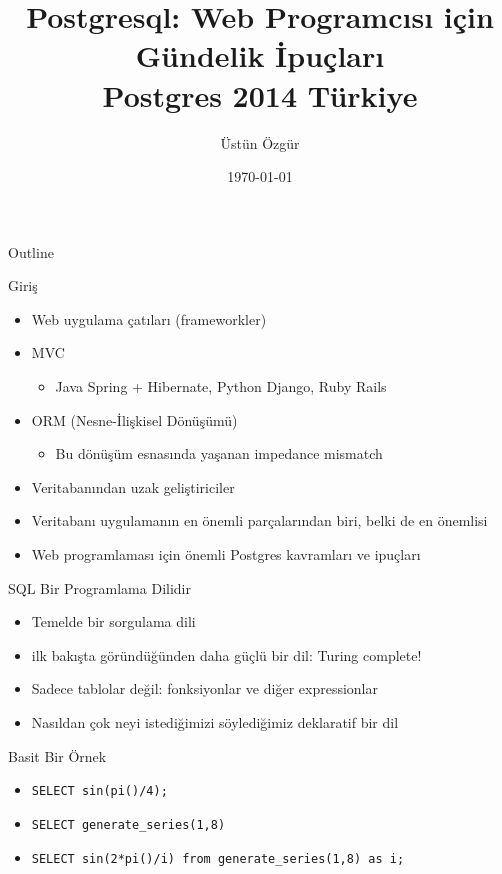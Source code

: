 \documentclass[presentation]{beamer}
\author{Üstün Özgür}
\date{\today}
\title{Postgresql: Web Programcısı için Gündelik İpuçları \\ Postgres 2014 Türkiye}
\begin{document}
\maketitle
\begin{frame}{Outline}
\tableofcontents
\end{frame}


\begin{frame}[label=sec-1]{Giriş}
\begin{itemize}
\item Web uygulama çatıları (frameworkler)

\item MVC
\begin{itemize}
\item Java Spring + Hibernate, Python Django, Ruby Rails
\end{itemize}
\item ORM (Nesne-İlişkisel Dönüşümü)
\begin{itemize}
\item Bu dönüşüm esnasında yaşanan impedance mismatch
\end{itemize}
\item Veritabanından uzak geliştiriciler
\item Veritabanı uygulamanın en önemli parçalarından biri, belki de en önemlisi
\item Web programlaması için önemli Postgres kavramları ve ipuçları
\end{itemize}
\end{frame}

\begin{frame}[label=sec-2]{SQL Bir Programlama Dilidir}
\begin{itemize}
\item Temelde bir sorgulama dili
\item ilk bakışta göründüğünden daha güçlü bir dil: Turing complete!
\item Sadece tablolar değil: fonksiyonlar ve diğer expressionlar
\item Nasıldan çok neyi istediğimizi söylediğimiz deklaratif bir dil
\end{itemize}
\end{frame}

\begin{frame}[fragile,label=sec-3]{Basit Bir Örnek}
 \begin{itemize}
\item \texttt{SELECT sin(pi()/4);}
\item \texttt{SELECT generate\_series(1,8)}
\item \texttt{SELECT sin(2*pi()/i) from generate\_series(1,8) as i;}
\end{itemize}
\end{frame}
\end{document}
